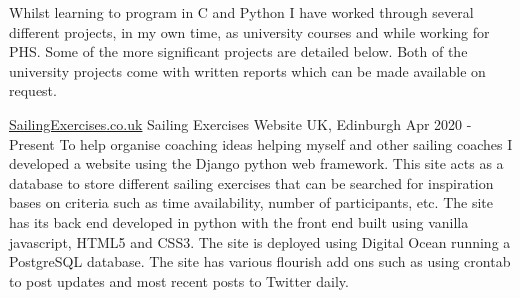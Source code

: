 
\begin{cvparagraph}
Whilst learning to program in C and Python I have worked through several different projects, in my own time, as university courses and while working for PHS. Some of the more significant projects are detailed below. Both of the university projects come with written reports which can be made available on request.
\end{cvparagraph}

\begin{cventries}
    \cventry
        {\href{www.sailingexercises.co.uk}{SailingExercises.co.uk}}
        {Sailing Exercises Website}
        {UK, Edinburgh}
        {Apr 2020 - Present}
        {
        To help organise coaching ideas helping myself and other sailing coaches I developed a website using the Django python web framework. This site acts as a database to store different sailing exercises that can be searched for inspiration bases on criteria such as time availability, number of participants, etc. The site has its back end developed in python with the front end built using vanilla javascript, HTML5 and CSS3. The site is deployed using Digital Ocean running a PostgreSQL database. The site has various flourish add ons such as using crontab to post updates and most recent posts to Twitter daily.
        }
\end{cventries}

